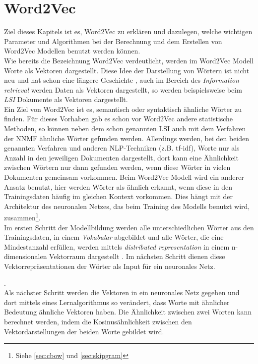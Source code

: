 \documentclass[12pt,a4paper]{report}
\begin{document}
\chapter{Word2Vec}
Ziel dieses Kapitels ist es, Word2Vec zu erklären und dazulegen, welche wichtigen Parameter und Algorithmen bei der Berechnung und dem Erstellen von Word2Vec Modellen benutzt werden können.\\
Wie bereits die Bezeichnung Word2Vec verdeutlicht, werden im Word2Vec Modell Worte als Vektoren dargestellt. Diese Idee der Darstellung von Wörtern ist nicht neu und hat schon eine längere Geschichte \cite{Hinton86}, auch im Bereich des \textit{Information retrieval} werden Daten als Vektoren dargestellt, so werden beispielsweise beim \textit{LSI} \cite{deerwester1990indexing} Dokumente als Vektoren dargestellt. \\
Ein Ziel von Word2Vec ist es, semantisch oder syntaktisch ähnliche Wörter zu finden. Für dieses Vorhaben gab es schon vor Word2Vec andere statistische Methoden, so können neben dem schon genannten LSI auch mit dem Verfahren der NNMF ähnliche Wörter gefunden werden. Allerdings werden, bei den beiden genannten Verfahren und anderen NLP-Techniken (z.B. tf-idf), Worte nur als Anzahl in den jeweiligen Dokumenten dargestellt, dort kann eine Ähnlichkeit zwischen Wörtern nur dann gefunden werden, wenn diese Wörter in vielen Dokumenten gemeinsam vorkommen. Beim Word2Vec Modell wird ein anderer Ansatz benutzt, hier werden Wörter als ähnlich erkannt, wenn diese in den Trainingsdaten häufig im gleichen Kontext vorkommen. Dies hängt mit der Architektur des neuronalen Netzes, das beim Training des Modells benutzt wird, zusammen\footnote{Siehe \ref{sec:cbow} und \ref{sec:skipgram}}.\\

Im ersten Schritt der Modellbildung werden alle unterschiedlichen Wörter aus den Trainingsdaten, in einem \textit{Vokabular} abgebildet und alle Wörter, die eine Mindestanzahl erfüllen, werden mittels \textit{distributed representation} in einem n-dimensionalen Vektorraum dargestellt \cite{DBLP:journals/corr/abs-1301-3781}. 
Im nächsten Schritt dienen diese Vektorrepräsentationen der Wörter als Input für ein  neuronales Netz. 

.\\

Als nächster Schritt werden die Vektoren in ein neuronales Netz gegeben und dort mittels eines Lernalgorithmus so verändert, dass Worte mit ähnlicher Bedeutung ähnliche Vektoren haben. Die Ähnlichkeit zwischen zwei Worten kann berechnet werden, indem die Kosinusähnlichkeit zwischen den Vektordarstellungen der beiden Worte gebildet wird.\\
\end{document}

